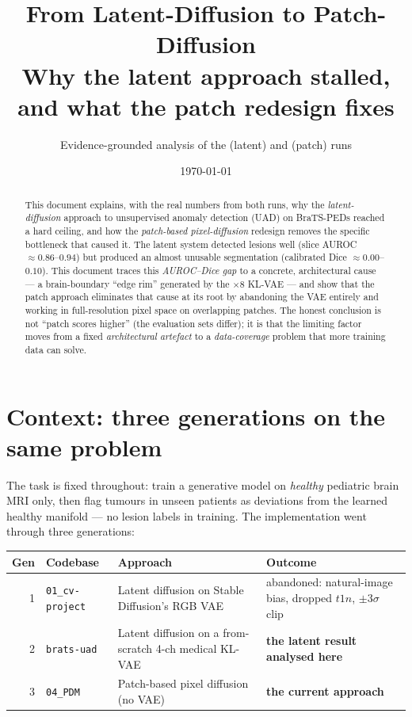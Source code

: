 \documentclass[11pt,a4paper]{article}
\title{\textbf{From Latent-Diffusion to Patch-Diffusion}\\[3pt]
\large Why the latent approach stalled, and what the patch redesign fixes}
\author{Evidence-grounded analysis of the \code{brats-uad} (latent) and
\code{04\_PDM} (patch) runs}
\date{\today}
\newcommand{\code}[1]{\texttt{\small #1}}
\begin{document}
\maketitle

\begin{abstract}
\noindent
This document explains, with the real numbers from both runs, why the
\emph{latent-diffusion} approach to unsupervised anomaly detection (UAD) on
BraTS-PEDs reached a hard ceiling, and how the \emph{patch-based pixel-diffusion}
redesign removes the specific bottleneck that caused it. The latent system
detected lesions well (slice AUROC $\approx0.86$--$0.94$) but produced an almost
unusable segmentation (calibrated Dice $\approx0.00$--$0.10$). This document traces this
\emph{AUROC--Dice gap} to a concrete, architectural cause --- a brain-boundary
``edge rim'' generated by the $\times8$ KL-VAE --- and show that the patch
approach eliminates that cause at its root by abandoning the VAE entirely and
working in full-resolution pixel space on overlapping patches. The honest
conclusion is not ``patch scores higher'' (the evaluation sets differ); it is
that the limiting factor moves from a fixed \emph{architectural artefact} to a
\emph{data-coverage} problem that more training data can solve.
\end{abstract}

\tableofcontents
\clearpage

\section{Context: three generations on the same problem}
The task is fixed throughout: train a generative model on \emph{healthy}
pediatric brain MRI only, then flag tumours in unseen patients as deviations
from the learned healthy manifold --- no lesion labels in training. The
implementation went through three generations:

\begin{longtable}{@{}rlll@{}}
\toprule
Gen & Codebase & Approach & Outcome \\
\midrule
\endhead
1 & \code{01\_cv-project} & Latent diffusion on Stable Diffusion's RGB VAE & abandoned: natural-image bias, dropped $t1n$, $\pm3\sigma$ clip \\
2 & \code{brats-uad}      & Latent diffusion on a from-scratch 4-ch medical KL-VAE & \textbf{the latent result analysed here} \\
3 & \code{04\_PDM}        & Patch-based pixel diffusion (no VAE) & \textbf{the current approach} \\
\bottomrule
\end{longtable}
\end{document}
